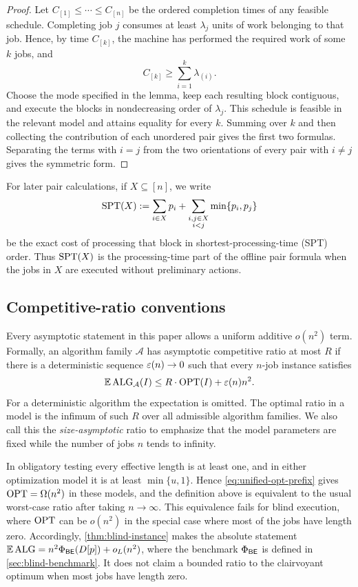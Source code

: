 \begin{proof}
Let $C_{[1]}\le\cdots\le C_{[n]}$ be the ordered completion times of any
feasible schedule.  Completing job $j$ consumes at least $\lambda_j$ units of work
belonging to that job.  Hence, by time $C_{[k]}$, the machine has performed
the required work of some $k$ jobs, and
\[
 C_{[k]}\ge\sum_{i=1}^k\lambda_{(i)}.
\]
Choose the mode specified in the lemma, keep each resulting block contiguous,
and execute the blocks in nondecreasing order of $\lambda_j$.  This schedule is
feasible in the relevant model and attains equality for every $k$.  Summing
over $k$ and then collecting the contribution of each unordered pair gives
the first two formulas.  Separating the terms with $i=j$ from the two
orientations of every pair with $i\ne j$ gives the symmetric form.
\end{proof}

For later pair calculations, if $X\subseteq[n]$, we write
\begin{equation}
 \operatorname{SPT}(X)\mathrel{:=}
 \sum_{i\in X}p_i
 +\sum_{\substack{i,j\in X\\i<j}}\min\{p_i,p_j\}
 \label{eq:spt-block-cost}
\end{equation}
be the exact cost of processing that block in shortest-processing-time
(SPT) order.  Thus \(\operatorname{SPT}(X)\) is the processing-time part of the offline
pair formula when the jobs in $X$ are executed without preliminary actions.

\subsection{Competitive-ratio conventions}

Every asymptotic statement in this paper allows a uniform additive
$o(n^2)$ term.  Formally, an algorithm family $\mathcal A$ has asymptotic
competitive ratio at most $R$ if there is a deterministic sequence
$\varepsilon(n)\to0$ such that every $n$-job instance satisfies
\begin{equation}
 \mathbb{E}\operatorname{ALG}_{\mathcal A}(I)
 \le R\cdot\operatorname{OPT}(I)+\varepsilon(n)n^2.
 \label{eq:cr-infty}
\end{equation}
For a deterministic algorithm the expectation is omitted.  The optimal ratio
in a model is the infimum of such $R$ over all admissible algorithm families.
We also call this the \emph{size-asymptotic} ratio to emphasize that the
model parameters are fixed while the number of jobs $n$ tends to infinity.

In obligatory testing every effective length is at least one, and in either
optimization model it is at least $\min\{u,1\}$.  Hence
\cref{eq:unified-opt-prefix} gives $\operatorname{OPT}=\Omega(n^2)$ in these models, and the
definition above is equivalent to the usual worst-case ratio after taking
$n\to\infty$.  This equivalence fails for blind execution, where $\operatorname{OPT}$ can
be $o(n^2)$ in the special case where most of the jobs have length zero.  Accordingly,
\cref{thm:blind-instance} makes the absolute statement
$\mathbb{E}\operatorname{ALG}=n^2\Phi_{\mathsf{BE}}(D[p])+o_L(n^2)$, where the benchmark $\Phi_{\mathsf{BE}}$ is defined
in \cref{sec:blind-benchmark}.  It does not claim a bounded ratio to the
clairvoyant optimum when most jobs have length zero.

